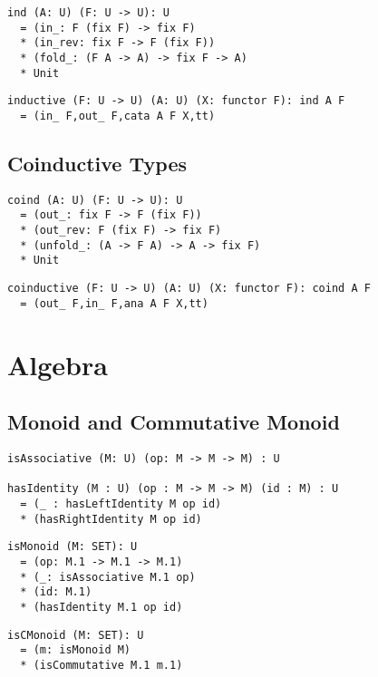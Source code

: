 \documentclass{article}
\begin{document}
\begin{lstlisting}[mathescape=true]
ind (A: U) (F: U -> U): U
  = (in_: F (fix F) -> fix F)
  * (in_rev: fix F -> F (fix F))
  * (fold_: (F A -> A) -> fix F -> A)
  * Unit
\end{lstlisting}

\begin{lstlisting}[mathescape=true]
inductive (F: U -> U) (A: U) (X: functor F): ind A F
  = (in_ F,out_ F,cata A F X,tt)
\end{lstlisting}

\subsection{Coinductive Types}

\begin{lstlisting}[mathescape=true]
coind (A: U) (F: U -> U): U
  = (out_: fix F -> F (fix F))
  * (out_rev: F (fix F) -> fix F)
  * (unfold_: (A -> F A) -> A -> fix F)
  * Unit
\end{lstlisting}

\begin{lstlisting}[mathescape=true]
coinductive (F: U -> U) (A: U) (X: functor F): coind A F
  = (out_ F,in_ F,ana A F X,tt)
\end{lstlisting}


\newpage
\section{Algebra}

\subsection{Monoid and Commutative Monoid}

\begin{lstlisting}[mathescape=true]
isAssociative (M: U) (op: M -> M -> M) : U

hasIdentity (M : U) (op : M -> M -> M) (id : M) : U
  = (_ : hasLeftIdentity M op id)
  * (hasRightIdentity M op id)
\end{lstlisting}

\begin{lstlisting}[mathescape=true]
isMonoid (M: SET): U
  = (op: M.1 -> M.1 -> M.1)
  * (_: isAssociative M.1 op)
  * (id: M.1)
  * (hasIdentity M.1 op id)
\end{lstlisting}

\begin{lstlisting}[mathescape=true]
isCMonoid (M: SET): U
  = (m: isMonoid M)
  * (isCommutative M.1 m.1)
\end{lstlisting}
\end{document}
